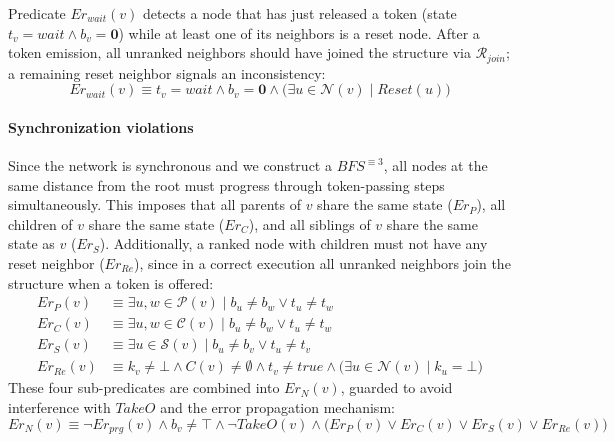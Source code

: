 \documentclass[a4paper, 12pt]{article}
\newcommand{\Neig}{\mathcal{N}}
\newcommand{\Pa}{\mathcal{P}}
\newcommand{\bz}{\mathbf{0}}
\newcommand{\rk}{k}
\newcommand{\Rjoin}{$\mathscr{R}_{join}$}
\begin{document}
Predicate $Er_{wait}(v)$ detects a node that has just released a token (state
$t_v = \mathit{wait} \wedge b_v = \bz$) while at least one of its neighbors
is a reset node. After a token emission, all unranked neighbors should have joined
the structure via \Rjoin; a remaining reset neighbor signals an inconsistency:
\begin{equation}
    Er_{wait}(v) \equiv t_v = \mathit{wait} \wedge b_v = \mathbf{0}
    \wedge \bigl(\exists u \in \Neig(v) \mid \mathit{Reset}(u)\bigr)
\label{eq:erwait}
\end{equation}

\paragraph*{Synchronization violations}

Since the network is synchronous and we construct a $BFS^{\equiv 3}$, all nodes at the
same distance from the root must progress through token-passing steps simultaneously.
This imposes that all parents of $v$ share the same state ($Er_P$), all children of $v$
share the same state ($Er_C$), and all siblings of $v$ share the same state as $v$
($ Er_S$). Additionally, a ranked node with children must not have any reset neighbor
($ Er_{Re}$), since in a correct execution all unranked neighbors join the structure when
a token is offered:
\begin{align}
    Er_P(v) &\equiv \exists u, w \in \Pa(v) \mid b_u \neq b_w \vee t_u \neq t_w
    \label{eq:Er_P}\\
    Er_C(v) &\equiv \exists u, w \in \mathcal{C}(v) \mid b_u \neq b_w \vee t_u \neq t_w
    \label{eq:ErC}\\
     Er_S(v) &\equiv \exists u \in \mathcal{S}(v) \mid b_u \neq b_v \vee t_u \neq t_v
    \label{eq:Er_S}\\
     Er_{Re}(v) &\equiv \rk_v \neq \bot \wedge C(v) \neq \emptyset
    \wedge t_v \neq \mathit{true}
    \wedge \bigl(\exists u \in \Neig(v) \mid \rk_u = \bot\bigr)
    \label{eq:Rtnd}
\end{align}
These four sub-predicates are combined into $Er_N(v)$, guarded to avoid interference
with $\mathit{TakeO}$ and the error propagation mechanism:
\begin{equation}
    Er_N(v) \equiv \neg Er_{prg}(v) \wedge b_v \neq \top \wedge \neg \mathit{TakeO}(v)
    \wedge \bigl(Er_P(v) \vee Er_C(v) \vee  Er_S(v) \vee  Er_{Re}(v)\bigr)
    \label{eq:erN}
\end{equation}
\end{document}
